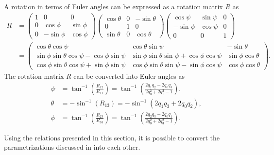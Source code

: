 A rotation in terms of Euler angles can be expressed as a rotation matrix $R$ as 
{\footnotesize{
\begin{align}
\label{eq:app-rotMatrix}
R 
&= \begin{pmatrix} 1 & 0 & 0 \\ 0 & \cos \phi & \sin \phi \\ 0 & -\sin \phi & \cos \phi \end{pmatrix}
\begin{pmatrix} \cos \theta & 0 & -\sin \theta \\ 0 & 1 & 0 \\ \sin \theta & 0 & \cos \theta \end{pmatrix}
\begin{pmatrix} \cos \psi & \sin \psi & 0 \\ -\sin \psi & \cos \psi & 0 \\ 0 & 0 & 1 \end{pmatrix} \\
&= \begin{pmatrix} \cos \theta \cos \psi & \cos \theta \sin \psi & -\sin \theta \\ 
\sin \phi \sin \theta \cos \psi - \cos \phi \sin \psi & \sin \phi \sin \theta \sin \psi + \cos \phi \cos \psi & \sin \phi \cos \theta \\ 
\cos \phi \sin \theta \cos \psi + \sin \phi \sin \psi & \cos \phi \sin \theta \sin \psi - \sin \phi \cos \psi & \cos \phi \cos \theta \end{pmatrix}.\nonumber
\end{align}}}%
The rotation matrix $R$ can be converted into Euler angles as
\begin{subequations}
\begin{align}
\psi &= \tan^{-1} \left( \tfrac{R_{12}}{R_{11}} \right) = \tan^{-1} \left( \tfrac{2 q_1 q_2 - 2 q_0 q_3}{2 q_0^2 + 2 q_1^2 - 1} \right), \\
\theta &= -\sin^{-1} \left( R_{13} \right) = - \sin^{-1} \left( 2 q_1 q_3 + 2 q_0 q_2 \right), \\
\phi &= \tan^{-1} \left( \tfrac{R_{23}}{R_{33}} \right) = \tan^{-1} \left( \tfrac{2 q_2 q_3 - 2 q_0 q_1}{2 q_0^2 + 2 q_3^2 - 1} \right).
\end{align}
\end{subequations}

Using the relations presented in this section, it is possible to convert the parametrizations discussed in  into each other. 
